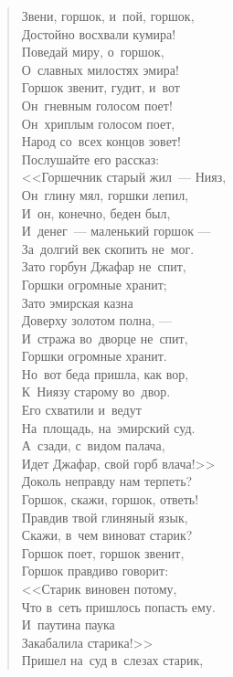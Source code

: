 \documentclass[12pt,a4paper]{book}
\begin{document}
\begin{verse}
Звени, горшок, и~пой, горшок, \\
Достойно восхвали кумира! \\
Поведай миру, о~горшок, \\
О~славных милостях эмира! \\
Горшок звенит, гудит, и~вот \\
Он~гневным голосом поет! \\
Он~хриплым голосом поет, \\
Народ со~всех концов зовет! \\
Послушайте его рассказ: \\
<<Горшечник старый жил~— Нияз, \\
Он~глину мял, горшки лепил, \\
И~он, конечно, беден был, \\
И~денег~— маленький горшок --- \\
За~долгий век скопить не~мог. \\
Зато горбун Джафар не~спит, \\ 
Горшки огромные хранит; \\
Зато эмирская казна \\
Доверху золотом полна, --- \\
И~стража во~дворце не~спит, \\
Горшки огромные хранит. \\
Но~вот беда пришла, как вор, \\
К~Ниязу старому во~двор. \\
Его схватили и~ведут \\
На~площадь, на~эмирский суд. \\
А~сзади, с~видом палача, \\
Идет Джафар, свой горб влача!>> \\
Доколь неправду нам терпеть? \\
Горшок, скажи, горшок, ответь! \\
Правдив твой глиняный язык, \\
Скажи, в~чем виноват старик? \\
Горшок поет, горшок звенит, \\
Горшок правдиво говорит: \\
<<Старик виновен потому, \\
Что в~сеть пришлось попасть ему. \\
И~паутина паука \\
Закабалила старика!>> \\
Пришел на~суд в~слезах старик, \\

\end{verse}
\end{document}
